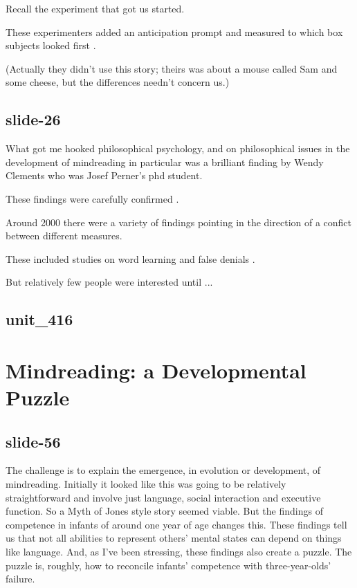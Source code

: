 \documentclass[12pt,\papersize]{extarticle}
\begin{document}
Recall the experiment that got us started.

These experimenters added an anticipation prompt and measured to which box subjects looked first \citep{Clements:1994cw}.

(Actually they didn't use this story; theirs was about a mouse called Sam and some cheese, but the differences needn't concern us.)

\subsection{slide-26}
What got me hooked philosophical psychology,
and on philosophical issues in the development of mindreading in particular
was a brilliant finding by Wendy Clements who was Josef Perner's phd student.

These findings were carefully confirmed \citep{Clements:2000nc,Garnham:2001ql,Ruffman:2001ng}.

Around 2000 there were a variety of findings pointing in the direction of a confict between different measures.

These included studies on word learning \citep{Carpenter:2002gc,Happe:2002sr} and false denials \citep{Polak:1999xr}.

But relatively few people were interested until ...

\subsection{unit\_416}


\section{Mindreading: a Developmental Puzzle}

\subsection{slide-56}
The challenge is to explain the emergence, in evolution or development, of mindreading.
Initially it looked like this was going to be relatively straightforward and involve just language, social interaction and executive function.
So a Myth of Jones style story seemed viable.
But the findings of competence in infants of around one year of age changes this.
These findings tell us that not all abilities to represent others' mental states can depend on things like language.
And, as I've been stressing, these findings also create a puzzle.
The puzzle is, roughly, how to reconcile infants' competence with three-year-olds' failure.
\end{document}
